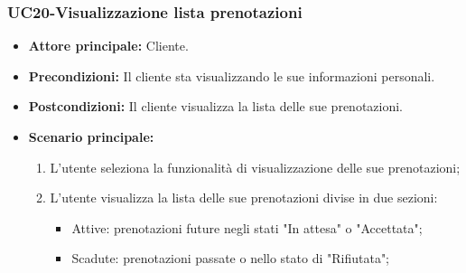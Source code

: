 \subsubsection{UC20-Visualizzazione lista prenotazioni}
\begin{itemize}
    \item \textbf{Attore principale: } Cliente.
    \item \textbf{Precondizioni: }Il cliente sta visualizzando le sue informazioni personali.
    \item \textbf{Postcondizioni: }Il cliente visualizza la lista delle sue prenotazioni.
    \item \textbf{Scenario principale:} 
        \begin{enumerate}
            \item L'utente seleziona la funzionalità di visualizzazione delle sue prenotazioni;
            \item L'utente visualizza la lista delle sue prenotazioni divise in due sezioni:
              \begin{itemize}
                \item Attive: prenotazioni future negli stati "In attesa" o "Accettata";
                \item Scadute: prenotazioni passate o nello stato di "Rifiutata";
              \end{itemize}
        \end{enumerate}
\end{itemize}

